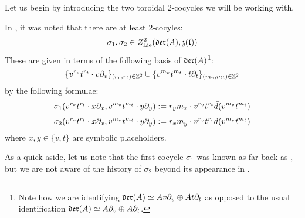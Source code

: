         Let us begin by introducing the two toroidal $2$-cocycles we will be working with.
        \begin{example} \label{example: billig_toroidal_cocycles}
            In \cite[p. 5, below Equation 1.3]{billig_energy_momentum_tensor}, it was noted that there are at least $2$-cocyles:
                $$\sigma_1, \sigma_2 \in Z^2_{\mathrm{Lie}}( \mathfrak{der}(A), \mathfrak{z}(\mathfrak{t}) )$$
            These are given in terms of the following basis of $\mathfrak{der}(A)$\footnote{Note how we are identifying $\mathfrak{der}(A) \simeq A v\partial_v \oplus A t\partial_t$ as opposed to the usual identification $\mathfrak{der}(A) \simeq A \partial_v \oplus A \partial_t$.}:
                $$\{ v^{r_v} t^{r_t} \cdot v \partial_v \}_{(r_v, r_t) \in \mathbb{Z}^2} \cup \{ v^{m_v} t^{m_t} \cdot t \partial_t \}_{(m_v, m_t) \in \mathbb{Z}^2}$$
            by the following formulae:
                $$\sigma_1( v^{r_v} t^{r_t} \cdot x \partial_x, v^{m_v} t^{m_t} \cdot y \partial_y ) := r_y m_x \cdot v^{r_v} t^{r_t} \bar{d}( v^{m_v} t^{m_t} )$$
                $$\sigma_2( v^{r_v} t^{r_t} \cdot x \partial_x, v^{m_v} t^{m_t} \cdot y \partial_y ) := r_x m_y \cdot v^{r_v} t^{r_t} \bar{d}( v^{m_v} t^{m_t} )$$
            where $x, y \in \{v, t\}$ are symbolic placeholders.
            
            As a quick aside, let us note that the first cocycle $\sigma_1$ was known as far back as \cite{moody_rao_yokonuma_vertex_representations_of_toroidal_lie_algebras}, but we are not aware of the history of $\sigma_2$ beyond its appearance in \cite{billig_energy_momentum_tensor}.
        \end{example}

